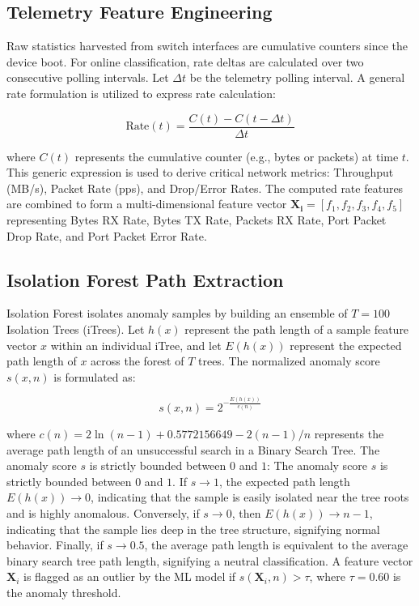 \documentclass[conference]{IEEEtran}
\begin{document}
\subsection{Telemetry Feature Engineering}
Raw statistics harvested from switch interfaces are cumulative counters since the device boot. For online classification, rate deltas are calculated over two consecutive polling intervals. Let $\Delta t$ be the telemetry polling interval. A general rate formulation is utilized to express rate calculation:

\begin{equation}
\text{Rate}(t) = \frac{C(t) - C(t - \Delta t)}{\Delta t}
\end{equation}

where $C(t)$ represents the cumulative counter (e.g., bytes or packets) at time $t$. This generic expression is used to derive critical network metrics: Throughput (MB/s), Packet Rate (pps), and Drop/Error Rates. The computed rate features are combined to form a multi-dimensional feature vector $\mathbf{X_i} = [f_1, f_2, f_3, f_4, f_5]$ representing Bytes RX Rate, Bytes TX Rate, Packets RX Rate, Port Packet Drop Rate, and Port Packet Error Rate.

\subsection{Isolation Forest Path Extraction}
Isolation Forest isolates anomaly samples by building an ensemble of $T = 100$ Isolation Trees (iTrees). Let $h(x)$ represent the path length of a sample feature vector $x$ within an individual iTree, and let $E(h(x))$ represent the expected path length of $x$ across the forest of $T$ trees. The normalized anomaly score $s(x, n)$ is formulated as:

\begin{equation}
s(x, n) = 2^{-\frac{E(h(x))}{c(n)}}
\end{equation}

where $c(n) = 2 \ln(n - 1) + 0.5772156649 - 2(n-1)/n$ represents the average path length of an unsuccessful search in a Binary Search Tree. The anomaly score $s$ is strictly bounded between $0$ and $1$:
The anomaly score $s$ is strictly bounded between $0$ and $1$. If $s \to 1$, the expected path length $E(h(x)) \to 0$, indicating that the sample is easily isolated near the tree roots and is highly anomalous. Conversely, if $s \to 0$, then $E(h(x)) \to n-1$, indicating that the sample lies deep in the tree structure, signifying normal behavior. Finally, if $s \to 0.5$, the average path length is equivalent to the average binary search tree path length, signifying a neutral classification.
A feature vector $\mathbf{X}_i$ is flagged as an outlier by the ML model if $s(\mathbf{X}_i, n) > \tau$, where $\tau = 0.60$ is the anomaly threshold.
\end{document}
